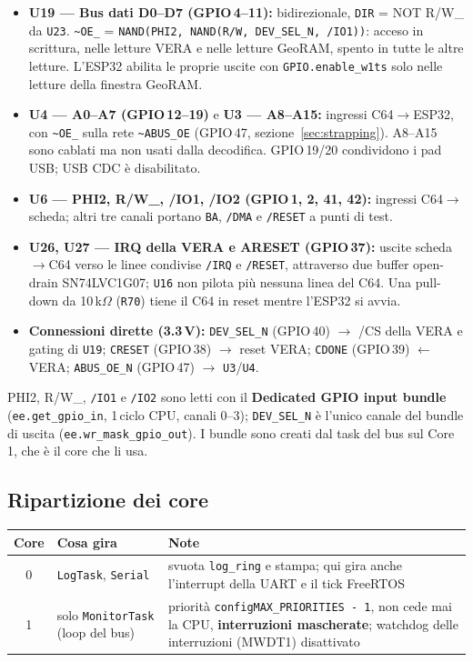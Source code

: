 \documentclass[12pt, a4paper]{article}
\begin{document}
\begin{itemize}
    \item {\bfseries U19 --- Bus dati D0--D7 (GPIO\,4--11):} bidirezionale, \texttt{DIR} = NOT R/W\_ da \texttt{U23}. \texttt{\textasciitilde OE\_} = \texttt{NAND(PHI2, NAND(R/W, DEV\_SEL\_N, /IO1))}: acceso in scrittura, nelle letture VERA e nelle letture GeoRAM, spento in tutte le altre letture. L'ESP32 abilita le proprie uscite con \texttt{GPIO.enable\_w1ts} solo nelle letture della finestra GeoRAM.
    \item {\bfseries U4 --- A0--A7 (GPIO\,12--19)} e {\bfseries U3 --- A8--A15:} ingressi C64$\rightarrow$ESP32, con \texttt{\textasciitilde OE\_} sulla rete \texttt{\textasciitilde ABUS\_OE} (GPIO\,47, sezione~\ref{sec:strapping}). A8--A15 sono cablati ma non usati dalla decodifica. GPIO\,19/20 condividono i pad USB; USB CDC è disabilitato.
    \item {\bfseries U6 --- PHI2, R/W\_, /IO1, /IO2 (GPIO\,1, 2, 41, 42):} ingressi C64$\rightarrow$scheda; altri tre canali portano \texttt{BA}, \texttt{/DMA} e \texttt{/RESET} a punti di test.
    \item {\bfseries U26, U27 --- IRQ della VERA e ARESET (GPIO\,37):} uscite scheda$\rightarrow$C64 verso le linee condivise \texttt{/IRQ} e \texttt{/RESET}, attraverso due buffer open-drain SN74LVC1G07; \texttt{U16} non pilota più nessuna linea del C64. Una pull-down da 10\,k$\Omega$ (\texttt{R70}) tiene il C64 in reset mentre l'ESP32 si avvia.
    \item {\bfseries Connessioni dirette (3.3\,V):} \texttt{DEV\_SEL\_N} (GPIO\,40) $\rightarrow$ /CS della VERA e gating di \texttt{U19}; \texttt{CRESET} (GPIO\,38) $\rightarrow$ reset VERA; \texttt{CDONE} (GPIO\,39) $\leftarrow$ VERA; \texttt{ABUS\_OE\_N} (GPIO\,47) $\rightarrow$ \texttt{U3}/\texttt{U4}.
\end{itemize}

PHI2, R/W\_, \texttt{/IO1} e \texttt{/IO2} sono letti con il \textbf{Dedicated GPIO input bundle} (\texttt{ee.get\_gpio\_in}, 1\,ciclo CPU, canali 0--3); \texttt{DEV\_SEL\_N} è l'unico canale del bundle di uscita (\texttt{ee.wr\_mask\_gpio\_out}). I bundle sono creati dal task del bus sul Core\,1, che è il core che li usa.

\subsection{Ripartizione dei core}
\label{sec:core}

\begin{center}
\begin{tabular}{clp{5.5cm}}
\toprule
\textbf{Core} & \textbf{Cosa gira} & \textbf{Note} \\
\midrule
0 & \texttt{LogTask}, \texttt{Serial} & svuota \texttt{log\_ring} e stampa; qui gira anche l'interrupt della UART e il tick FreeRTOS \\
1 & solo \texttt{MonitorTask} (loop del bus) & priorità \texttt{configMAX\_PRIORITIES - 1}, non cede mai la CPU, \textbf{interruzioni mascherate}; watchdog delle interruzioni (MWDT1) disattivato \\
\bottomrule
\end{tabular}
\end{center}
\end{document}
